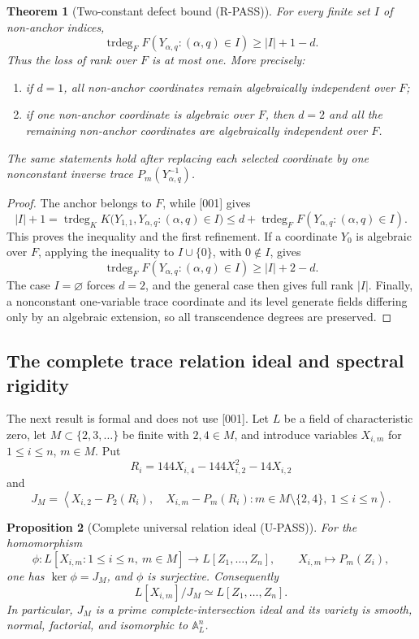 \documentclass[11pt]{article}
\theoremstyle{keio}
\newtheorem{theorem}{Theorem}[section]
\newtheorem{proposition}[theorem]{Proposition}
\theoremstyle{definition}
\theoremstyle{remark}
\newcommand{\trdeg}{\operatorname{trdeg}}
\newcommand{\UPASS}{\textcolor{keiogreen}{\textsf{U-PASS}}}
\newcommand{\RPASS}{\textcolor{keioxblue}{\textsf{R-PASS}}}
\begin{document}
\begin{theorem}[Two-constant defect bound (\RPASS)]
\label{thm:transfer-two-constant-defect}
For every finite set \(I\) of non-anchor indices,
\[
 \trdeg_FF(Y_{\alpha,q}:(\alpha,q)\in I)
 \ge |I|+1-d.
\]
Thus the loss of rank over \(F\) is at most one.  More precisely:
\begin{enumerate}
\item if \(d=1\), all non-anchor coordinates remain algebraically
independent over \(F\);
\item if one non-anchor coordinate is algebraic over \(F\), then \(d=2\)
and all the remaining non-anchor coordinates are algebraically independent
over \(F\).
\end{enumerate}
The same statements hold after replacing each selected coordinate by one
nonconstant inverse trace \(P_m(Y_{\alpha,q}^{-1})\).
\end{theorem}

\begin{proof}
The anchor belongs to \(F\), while [001] gives
\[
 |I|+1
 =\trdeg_KK\bigl(Y_{1,1},Y_{\alpha,q}:(\alpha,q)\in I\bigr)
 \le d+\trdeg_FF(Y_{\alpha,q}:(\alpha,q)\in I).
\]
This proves the inequality and the first refinement.  If a coordinate
\(Y_0\) is algebraic over \(F\), applying the inequality to
\(I\cup\{0\}\), with \(0\notin I\), gives
\[
 \trdeg_FF(Y_{\alpha,q}:(\alpha,q)\in I)\ge |I|+2-d.
\]
The case \(I=\varnothing\) forces \(d=2\), and the general case then gives
full rank \(|I|\).  Finally, a nonconstant one-variable trace coordinate
and its level generate fields differing only by an algebraic extension, so
all transcendence degrees are preserved.
\end{proof}

\subsection{The complete trace relation ideal and spectral rigidity}

The next result is formal and does not use [001].  Let \(L\) be a field of
characteristic zero, let \(M\subset\{2,3,\ldots\}\) be finite with
\(2,4\in M\), and introduce variables \(X_{i,m}\) for
\(1\le i\le n\), \(m\in M\).  Put
\[
 R_i=144X_{i,4}-144X_{i,2}^2-14X_{i,2}
\]
and
\[
 J_M=\left\langle
 X_{i,2}-P_2(R_i),\quad
 X_{i,m}-P_m(R_i):m\in M\setminus\{2,4\},\ 1\le i\le n
 \right\rangle.
\]

\begin{proposition}[Complete universal relation ideal (\UPASS)]
\label{prop:transfer-trace-ideal}
For the homomorphism
\[
 \phi:L[X_{i,m}:1\le i\le n,\ m\in M]
 \longrightarrow L[Z_1,\ldots,Z_n],
 \qquad X_{i,m}\longmapsto P_m(Z_i),
\]
one has \(\ker\phi=J_M\), and \(\phi\) is surjective.  Consequently
\[
 L[X_{i,m}]/J_M\simeq L[Z_1,\ldots,Z_n].
\]
In particular, \(J_M\) is a prime complete-intersection ideal and its
variety is smooth, normal, factorial, and isomorphic to \(\mathbb A_L^n\).
\end{proposition}
\end{document}
